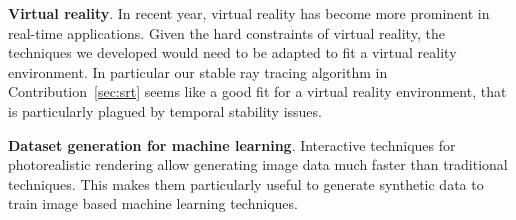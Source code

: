 \textbf{Virtual reality}. In recent year, virtual reality has become more prominent in real-time applications. Given the hard constraints of virtual reality, the techniques we developed would need to be adapted to fit a virtual reality environment. In particular our stable ray tracing algorithm in Contribution~\ref{sec:srt} seems like a good fit for a virtual reality environment, that is particularly plagued by temporal stability issues. 

\textbf{Dataset generation for machine learning}. Interactive techniques for photorealistic rendering allow generating image data much faster than traditional techniques. This makes them particularly useful to generate synthetic data to train image based machine learning techniques.  